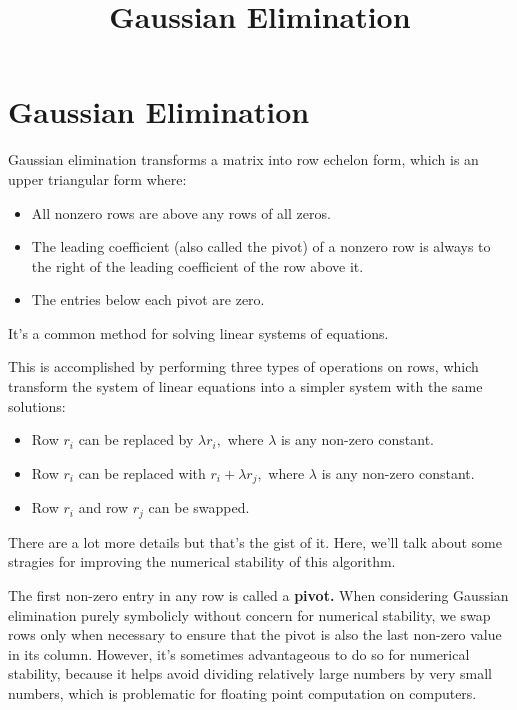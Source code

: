 \documentclass{article}
\title{Gaussian Elimination}
\begin{document}
\section{Gaussian Elimination}

Gaussian elimination transforms a matrix into row echelon form, which is an upper triangular form where:

\begin{itemize}
\item All nonzero rows are above any rows of all zeros.
\end{itemize}

\begin{itemize}
\item The leading coefficient (also called the pivot) of a nonzero row is always to the right of the leading coefficient of the row above it.
\end{itemize}

\begin{itemize}
\item The entries below each pivot are zero.
\end{itemize}

It's a common method for solving linear systems of equations.

This is accomplished by performing three types of operations on rows, which transform the system of linear equations into a simpler system with the same solutions:

\begin{itemize}
\item Row $r_i$ can be replaced by $\lambda r_i,$ where $\lambda$ is any non-zero constant.
\end{itemize}

\begin{itemize}
\item Row $r_i$ can be replaced with $r_i + \lambda r_j,$ where $\lambda$ is any non-zero constant.
\end{itemize}

\begin{itemize}
\item Row $r_i$ and row $r_j$ can be swapped.
\end{itemize}

There are a lot more details but that's the gist of it. Here, we'll talk about some stragies for improving the numerical stability of this algorithm.

The first non-zero entry in any row is called a \textbf{pivot.} When considering Gaussian elimination purely symbolicly without concern for numerical stability, we swap rows only when necessary to ensure that the pivot is also the last non-zero value in its column. However, it's sometimes advantageous to do so for numerical stability, because it helps avoid dividing relatively large numbers by very small numbers, which is problematic for floating point computation on computers.
\end{document}
